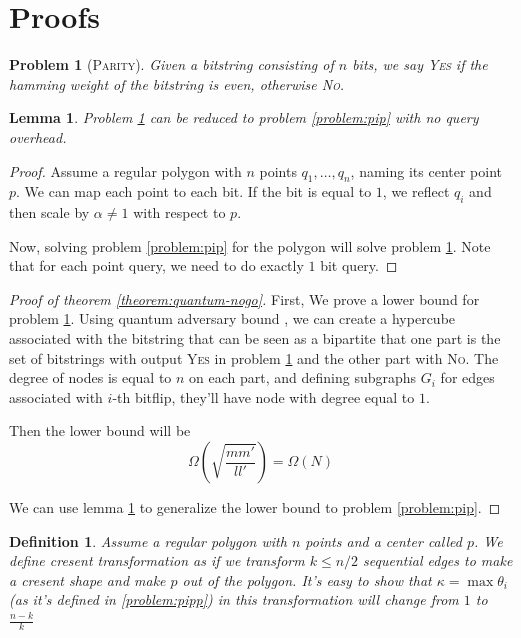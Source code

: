 \documentclass{article}
\newtheorem{definition}{Definition}
\newtheorem{problem}{Problem}
\newtheorem{lemma}{Lemma}
\begin{document}
\section{Proofs}
\begin{problem}[\textsc{Parity}]
\label{problem:parity}
Given a bitstring consisting of $n$ bits, we say \textsc{Yes} if the hamming weight of the bitstring is even, otherwise \textsc{No}.
\end{problem}

\begin{lemma}
\label{lemma:reduction}
Problem \ref{problem:parity} can be reduced to problem \ref{problem:pip} with no query overhead.
\end{lemma}
\begin{proof}
Assume a regular polygon with $n$ points $q_1, \dots, q_n$, naming its center point $p$. We can map each point to each bit. If the bit is equal to $1$, we reflect $q_i$ and then scale by $\alpha \ne 1$ with respect to $p$.

Now, solving problem \ref{problem:pip} for the polygon will solve problem \ref{problem:parity}. Note that for each point query, we need to do exactly $1$ bit query. 
\end{proof}

\begin{proof}[Proof of theorem \ref{theorem:quantum-nogo}]
First, We prove a lower bound for problem \ref{problem:parity}. Using quantum adversary bound \cite{ambainis2002}, we can create a hypercube associated with the bitstring that can be seen as a bipartite that one part is the set of bitstrings with output \textsc{Yes} in problem \ref{problem:parity} and the other part with \textsc{No}. The degree of nodes is equal to $n$ on each part, and defining subgraphs $G_i$ for edges associated with $i$-th bitflip, they'll have node with degree equal to $1$.

Then the lower bound will be 
\[ \Omega\left(\sqrt{\frac{mm'}{ll'}}\right) = \Omega(N) \]

We can use lemma \ref{lemma:reduction} to generalize the lower bound to problem \ref{problem:pip}.
\end{proof} 

\begin{definition}
\label{def:cresent}
Assume a regular polygon with $n$ points and a center called $p$. We define cresent transformation as if we transform $k \le n/2$ sequential edges to make a cresent shape and make $p$ out of the polygon. It's easy to show that $\kappa = \max \theta_i$ (as it's defined in \ref{problem:pipp}) in this transformation will change from $1$ to $\frac{n-k}{k}$
\end{definition}
\end{document}
